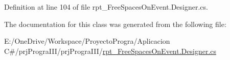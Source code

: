 Definition at line 104 of file rpt\+\_\+\+Free\+Spaces\+On\+Event.\+Designer.\+cs.



The documentation for this class was generated from the following file\+:\begin{DoxyCompactItemize}
\item 
E\+:/\+One\+Drive/\+Workspace/\+Proyecto\+Progra/\+Aplicacion C\#/prj\+Progra\+I\+I\+I/prj\+Progra\+I\+I\+I/\hyperlink{rpt___free_spaces_on_event_8_designer_8cs}{rpt\+\_\+\+Free\+Spaces\+On\+Event.\+Designer.\+cs}\end{DoxyCompactItemize}
